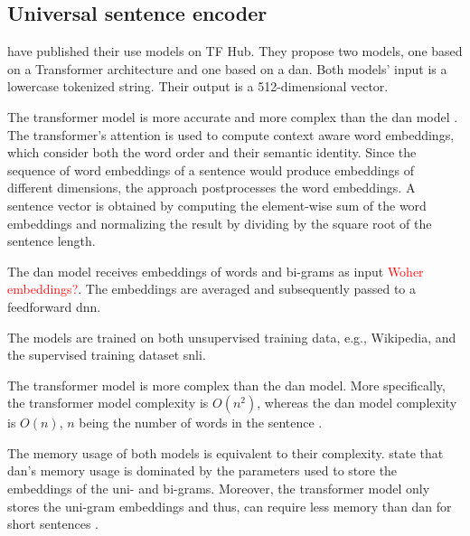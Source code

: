 \subsection{Universal sentence encoder}\label{subsec:univ-sent-encoder}

\citeauthor{UniversalSentEnc2018} have published their \ac{use} models on TF Hub.
They propose two models, one based on a Transformer architecture and one based on a \ac{dan}.
Both models' input is a lowercase tokenized string.
Their output is a 512-dimensional vector.

The transformer model is more accurate and more complex than the \ac{dan} model \cite{UniversalSentEnc2018}.
The transformer's attention is used to compute context aware word embeddings, which consider both the word order and their semantic identity.
Since the sequence of word embeddings of a sentence would produce embeddings of different dimensions, the approach postprocesses the word embeddings.
A sentence vector is obtained by computing the element-wise sum of the word embeddings 
and normalizing the result by dividing by the square root of the sentence length.

The \ac{dan} model receives embeddings of words and bi-grams as input \textcolor{red}{Woher embeddings?}.
The embeddings are averaged and subsequently passed to a feedforward \ac{dnn}.

The models are trained on both unsupervised training data, e.g., Wikipedia, and the supervised training dataset \ac{snli}.

The transformer model is more complex than the \ac{dan} model.
More specifically, the transformer model complexity is $O(n^2)$, whereas the \ac{dan} model complexity is $O(n)$, 
$n$ being the number of words in the sentence \cite{UniversalSentEnc2018}.

The memory usage of both models is equivalent to their complexity.
\citeauthor{UniversalSentEnc2018} state that \ac{dan}'s memory usage is dominated by the parameters used to store the embeddings of the uni- and bi-grams.
Moreover, the transformer model only stores the uni-gram embeddings and thus, can require less memory than \ac{dan} for short sentences \cite{UniversalSentEnc2018}.





